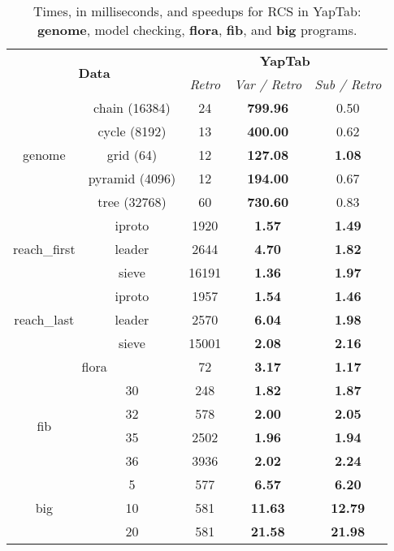 \begin{table}[ht]
\centering
\small{
  \begin{tabular}{cc|ccc}
   \hline
    \hline
    \multicolumn{2}{c|}{\multirow{2}{*}{\normalsize{\textbf{Data}}}} & \multicolumn{3}{c}{\normalsize{\textbf{YapTab}}} \\
     \multicolumn{2}{c|}{} & \small{\textit{Retro}} & \textit{\small{Var / Retro}} & \textit{\small{Sub / Retro}} \\
   \hline
   \hline
   
   \multirow{5}{*}{genome} &  \footnotesize{chain  (16384)} &  24 &  \textbf{799.96}  &  0.50 \\
   &  \footnotesize{cycle  (8192)} &  13 &  \textbf{400.00}  &  0.62 \\
   &  \footnotesize{grid  (64)} &  12 &  \textbf{127.08}  &  \textbf{1.08} \\
   &  \footnotesize{pyramid  (4096)} &  12 &  \textbf{194.00}  &  0.67 \\
   &  \footnotesize{tree  (32768)} &  60 &  \textbf{730.60}  &  0.83 \\
   \hline

   \multirow{3}{*}{reach\_first} &  \footnotesize{iproto } &  1920 &  \textbf{1.57}  &  \textbf{1.49} \\
   &  \footnotesize{leader} &  2644 &  \textbf{4.70}  &  \textbf{1.82} \\
   &  \footnotesize{sieve} &  16191 &  \textbf{1.36}  &  \textbf{1.97} \\
   \hline
   \multirow{3}{*}{reach\_last} &  \footnotesize{iproto } &  1957 &  \textbf{1.54}  &  \textbf{1.46} \\
   &  \footnotesize{leader} &  2570 &  \textbf{6.04}  &  \textbf{1.98} \\
   &  \footnotesize{sieve} &  15001 &  \textbf{2.08}  &  \textbf{2.16} \\
   \hline
   \multicolumn{2}{c|}{flora} & 72 & \textbf{3.17} & \textbf{1.17} \\
   \hline
   \multirow{4}{*}{fib} &  30 &  248 &  \textbf{1.82}  &  \textbf{1.87} \\
   &  32 &  578 &  \textbf{2.00}  &  \textbf{2.05} \\
   &  35 &  2502 &  \textbf{1.96}  &  \textbf{1.94} \\
   &  36 &  3936 &  \textbf{2.02}  &  \textbf{2.24} \\
   \hline
   \multirow{3}{*}{big} &  5 &  577 &  \textbf{6.57}  &  \textbf{6.20} \\
   &  10 &  581 &  \textbf{11.63}  &  \textbf{12.79} \\
   &  20 &  581 &  \textbf{21.58}  &  \textbf{21.98} \\
   \hline
\hline
\end{tabular}
}
\caption{Times, in milliseconds, and speedups for RCS in YapTab: \textbf{genome}, model checking, \textbf{flora},
\textbf{fib}, and \textbf{big} programs.}
\label{tbl:results_detail_gain_model}
\end{table}